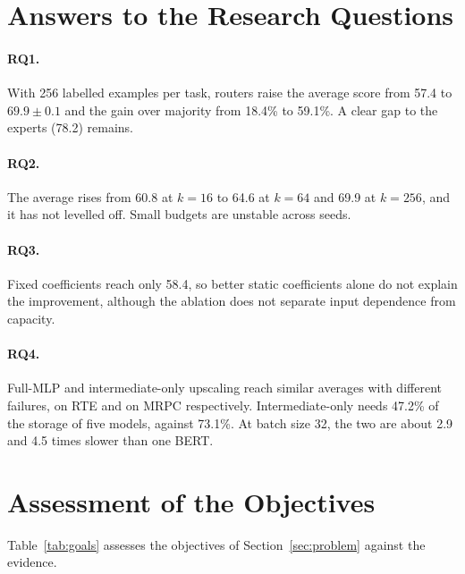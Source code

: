 \section{Answers to the Research Questions}

\paragraph{RQ1.} With 256 labelled examples per task, routers raise the average score from 57.4 to $69.9\pm0.1$ and the gain over majority from 18.4\% to 59.1\%. A clear gap to the experts (78.2) remains.

\paragraph{RQ2.} The average rises from 60.8 at $k=16$ to 64.6 at $k=64$ and 69.9 at $k=256$, and it has not levelled off. Small budgets are unstable across seeds.

\paragraph{RQ3.} Fixed coefficients reach only 58.4, so better static coefficients alone do not explain the improvement, although the ablation does not separate input dependence from capacity.

\paragraph{RQ4.} Full-MLP and intermediate-only upscaling reach similar averages with different failures, on RTE and on MRPC respectively. Intermediate-only needs 47.2\% of the storage of five models, against 73.1\%. At batch size 32, the two are about 2.9 and 4.5 times slower than one BERT.

\section{Assessment of the Objectives}

Table~\ref{tab:goals} assesses the objectives of Section~\ref{sec:problem} against the evidence.

